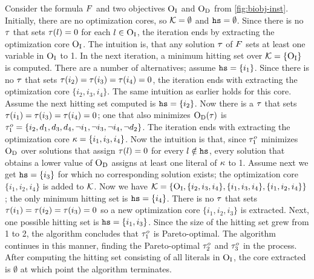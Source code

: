 \begin{example}
  Consider the formula $F$ and two objectives $\textsc{O}_{\text{I}}$ and $\textsc{O}_{\text{D}}$ from \cref{fig:biobj-inst}. 
  Initially, there are no optimization cores, so $\mathcal{K} = \emptyset$ and $\texttt{hs} = \emptyset$.
  Since there is no $\tau$ that sets $\tau(l) = 0$ for each $l \in \textsc{O}_{\text{I}}$, the iteration ends by extracting the optimization core $\textsc{O}_{\text{I}}$. 
  The intuition is, that any solution $\tau$ of $F$ sets at least one variable in $\textsc{O}_{\text{I}}$ to 1.
  In the next iteration, a minimum hitting set over $\mathcal{K} = \{ \textsc{O}_{\text{I}} \}$ is computed.
  There are a number of alternatives;
  assume $\texttt{hs} = \{ i_1 \}$.
  Since there is no $\tau$ that sets $\tau(i_2) = \tau(i_3) = \tau(i_4) = 0$, the iteration ends with extracting the optimization core $\{ i_2, i_3, i_4\}$.
  The same intuition as earlier holds for this core.
  Assume the next hitting set computed is $\texttt{hs} = \{i_2\}$.
  Now there is a $\tau$ that sets $\tau(i_1) = \tau(i_3) = \tau(i_4) = 0$;
  one that also minimizes $\textsc{O}_{\text{D}}(\tau)$ is $\tau^o_1 = \{i_2,\allowbreak d_1,\allowbreak d_3,\allowbreak d_4,\allowbreak \lnot i_1,\allowbreak \lnot i_3,\allowbreak \lnot i_4,\allowbreak \lnot d_2\}$.
  The iteration ends with extracting the optimization core $\kappa = \{i_1, i_3, i_4\}$.
  Now the intuition is that, since $\tau^o_1$ minimizes $\textsc{O}_{\text{D}}$ over solutions that assign $\tau(l) = 0$ for every $l \notin \texttt{hs}$, every solution that obtains a lower value of $\textsc{O}_{\text{D}}$ assigns at least one literal of $\kappa$ to 1. 
  Assume next we get $\texttt{hs} = \{i_3\}$ for which no corresponding solution exists;
  the optimization core $\{i_1, i_2, i_4\}$ is added to $\mathcal{K}$.
  Now we have $\mathcal{K} = \{ \textsc{O}_{\text{I}}, \{i_2, i_3, i_4\}, \{i_1, i_3, i_4\}, \{i_1, i_2, i_4\}\}$;
  the only minimum hitting set is $\texttt{hs} = \{ i_4 \}$.
  There is no $\tau$ that sets $\tau(i_1) = \tau(i_2) = \tau(i_3) = 0$ so a new optimization core $\{i_1, i_2, i_3\}$ is extracted. 
  Next, one possible hitting set is $\texttt{hs} = \{i_1, i_3\}$.
  Since the size of the hitting set grew from 1 to 2, the algorithm concludes that $\tau^o_1$ is Pareto-optimal. 
  The algorithm continues in this manner, finding the Pareto-optimal $\tau^o_2$ and $\tau^o_3$ in the process.
  After computing the hitting set consisting of all literals in $\textsc{O}_{\text{I}}$, the core extracted is $\emptyset$ at which point the algorithm terminates. 
\end{example}

